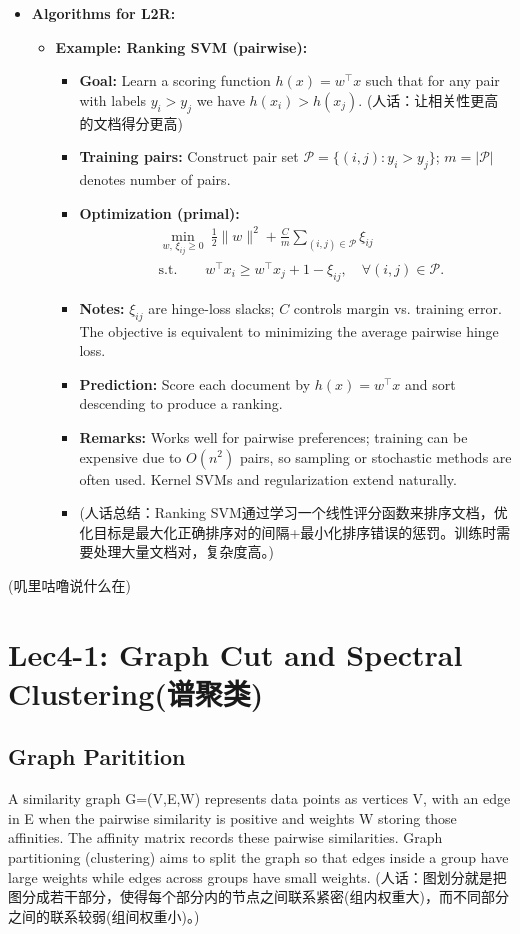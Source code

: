 \documentclass[UTF8]{ctexart}
\begin{document}
\begin{itemize}
    \item \textbf{Algorithms for L2R:}
    \begin{itemize}
        \item \textbf{Example: Ranking SVM (pairwise):}
        \begin{itemize}
            \item \textbf{Goal:} Learn a scoring function $h(x)=w^\top x$ such that for any pair with labels $y_i>y_j$ we have $h(x_i) > h(x_j)$.
            (人话：让相关性更高的文档得分更高)
            \item \textbf{Training pairs:} Construct pair set $\mathcal{P}=\{(i,j): y_i>y_j\}$; $m=|\mathcal{P}|$ denotes number of pairs.
            \item \textbf{Optimization (primal):}
            \[\begin{aligned}
                &\min_{w,\,\xi_{ij}\ge 0} \ \frac{1}{2}\|w\|^2 + \frac{C}{m} \sum_{(i,j)\in\mathcal{P}} \xi_{ij} \\
                &\text{s.t.} \qquad w^\top x_i \ge w^\top x_j + 1 - \xi_{ij}, \quad \forall (i,j) \in \mathcal{P}.
            \end{aligned}\]
            \item \textbf{Notes:} $\xi_{ij}$ are hinge-loss slacks; $C$ controls margin vs. training error. The objective is equivalent to minimizing the average pairwise hinge loss.
            \item \textbf{Prediction:} Score each document by $h(x)=w^\top x$ and sort descending to produce a ranking.
            \item \textbf{Remarks:} Works well for pairwise preferences; training can be expensive due to $O(n^2)$ pairs, so sampling or stochastic methods are often used. Kernel SVMs and regularization extend naturally.
            \item (人话总结：Ranking SVM通过学习一个线性评分函数来排序文档，优化目标是最大化正确排序对的间隔+最小化排序错误的惩罚。训练时需要处理大量文档对，复杂度高。)
        \end{itemize}
    \end{itemize}
\end{itemize}
(叽里咕噜说什么在)

\section{Lec4-1: Graph Cut and Spectral Clustering(谱聚类)}
\subsection{Graph Paritition}
A similarity graph G=(V,E,W) represents data points as vertices V, 
with an edge in E when the pairwise similarity is positive and weights W storing those affinities.
The affinity matrix records these pairwise similarities.
Graph partitioning (clustering) aims to split the graph so that edges inside a group have large weights while edges across groups have small weights.
(人话：图划分就是把图分成若干部分，使得每个部分内的节点之间联系紧密(组内权重大)，而不同部分之间的联系较弱(组间权重小)。)
\\
\end{document}
